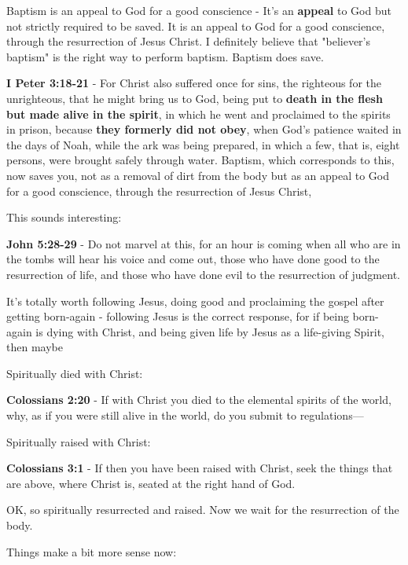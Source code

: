 \documentclass[11pt]{article}
\begin{document}
Baptism is an appeal to God for a good conscience - It's an \textbf{appeal} to God but not strictly required to be saved.
It is an appeal to God for a good conscience, through the resurrection of Jesus Christ.
I definitely believe that "believer's baptism" is the right way to perform baptism.
Baptism does save.

\textbf{I Peter 3:18-21} - For Christ also suffered once for sins, the righteous for the unrighteous, that he might bring us to God, being put to \textbf{death in the flesh but made alive in the spirit}, in which he went and proclaimed to the spirits in prison, because \textbf{they formerly did not obey}, when God's patience waited in the days of Noah, while the ark was being prepared, in which a few, that is, eight persons, were brought safely through water. Baptism, which corresponds to this, now saves you, not as a removal of dirt from the body but as an appeal to God for a good conscience, through the resurrection of Jesus Christ,

This sounds interesting:

\textbf{John 5:28-29} - Do not marvel at this, for an hour is coming when all who are in the tombs will hear his voice and come out, those who have done good to the resurrection of life, and those who have done evil to the resurrection of judgment.

It's totally worth following Jesus, doing good and proclaiming the gospel after getting born-again - following Jesus is the correct response, for if being born-again is dying with Christ, and being given life by Jesus as a life-giving Spirit,
then maybe 

Spiritually died with Christ:

\textbf{Colossians 2:20} - If with Christ you died to the elemental spirits of the world, why, as if you were still alive in the world, do you submit to regulations—

Spiritually raised with Christ:

\textbf{Colossians 3:1} - If then you have been raised with Christ, seek the things that are above, where Christ is, seated at the right hand of God.

OK, so spiritually resurrected and raised. Now we wait for the resurrection of the body.

Things make a bit more sense now:
\end{document}
